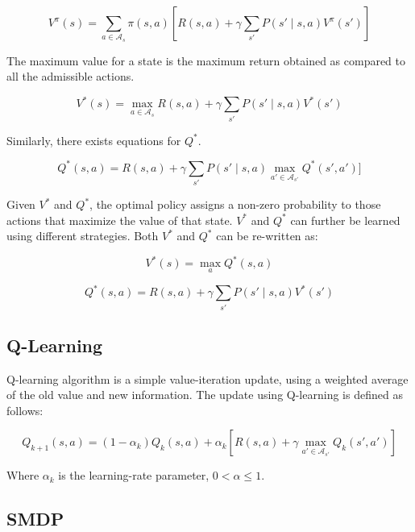 \begin{equation}
    V^\pi (s)=\sum_{a \in \mathcal{A}_s} \pi(s,a)[R(s,a)  + \gamma \sum_{s'} P(s'\mid s,a) V^\pi (s')]
\end{equation}

The maximum value for a state is the maximum return obtained as compared to all the admissible actions. 


\begin{equation}
    V^* (s)=   \max_{a \in \mathcal{A}_s } ⁡R(s,a)  + \gamma \sum_{s'} P(s' \mid s,a) V^* (s')
\end{equation}

Similarly, there exists equations for \(Q^*\).

\begin{equation}
    Q^* (s,a)=R(s,a)+\gamma \sum_{s'} P(s'\mid s,a)   \max_{a' \in \mathcal{A}_{s'}}  ⁡Q^* (s',a')]    
\end{equation}


Given \(V^*\) and \(Q^*\), the optimal policy assigns a non-zero probability to those actions that maximize the value of that state. \(V^*\) and \(Q^*\) can further be learned using different strategies. Both \(V^*\) and \(Q^*\) can be re-written as:

\begin{equation}
    V^* (s)=\max_a ⁡Q^* (s,a)
\end{equation}

\begin{equation}
    Q^* (s,a)=R(s,a)+ \gamma \sum_{s'} P(s'\mid s,a)  V^* (s' ) 
\end{equation}




\subsection{Q-Learning}


Q-learning algorithm is a simple value-iteration update, using a weighted average of the old value and new information. The update using Q-learning is defined as follows:

\begin{equation}
    Q_{k+1} (s,a)=(1-\alpha_k ) Q_k (s,a)+\alpha_k[R(s,a)+\gamma   \max_{a' \in \mathcal{A}_{s'}}⁡ Q_k (s',a' )]
\end{equation}

Where \(\alpha_k\) is the learning-rate parameter, \(0 < \alpha \leq 1\). 



\subsection{SMDP}

